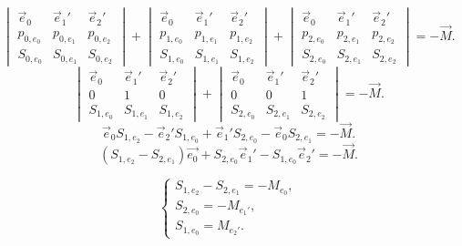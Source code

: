 \begin{equation*}
	\begin{vmatrix} 
		\vec e_0 &  \vec e_1' & \vec e_2' \\ 
		p_{0,{e_0}} & p_{0,{e_1}} & p_{0,{e_2}} \\ 
		S_{0,{e_0}} & S_{0,{e_1}} & S_{0,{e_2}}
	\end{vmatrix}
	+
	\begin{vmatrix} 
		\vec e_0 &  \vec e_1' & \vec e_2' \\ 
		p_{1,{e_0}} & p_{1,{e_1}} & p_{1,{e_2}} \\ 
		S_{1,{e_0}} & S_{1,{e_1}} & S_{1,{e_2}}
	\end{vmatrix}
	+
	\begin{vmatrix} 
		\vec e_0 &  \vec e_1' & \vec e_2' \\ 
		p_{2,{e_0}} & p_{2,{e_1}} & p_{2,{e_2}} \\ 
		S_{2,{e_0}} & S_{2,{e_1}} & S_{2,{e_2}}
	\end{vmatrix}
	= -\vec{M}.
\end{equation*}
\begin{equation*}
	\begin{vmatrix} 
		\vec e_0 &  \vec e_1' & \vec e_2' \\ 
		0 & 1 & 0 \\ 
		S_{1,{e_0}} & S_{1,{e_1}} & S_{1,{e_2}}
	\end{vmatrix}
	+
	\begin{vmatrix} 
		\vec e_0 &  \vec e_1' & \vec e_2' \\ 
		0 & 0 & 1 \\ 
		S_{2,{e_0}} & S_{2,{e_1}} & S_{2,{e_2}}
	\end{vmatrix}
	= -\vec{M}.
\end{equation*}
\begin{equation*}
	\vec e_0 S_{1,{e_2}} - \vec e_2' S_{1,{e_0}} + \vec e_1'S_{2,{e_0}} - \vec e_0 S_{2,{e_1}}
	= -\vec{M}.
\end{equation*}
\begin{equation*}
	\left(S_{1,{e_2}} -  S_{2,{e_1}} \right)\vec{e_0}
	+ S_{2,{e_0}} \vec e_1' 
	- S_{1,{e_0}} \vec e_2' 
	= -\vec{M}.
\end{equation*}

\begin{equation}
\left\{\begin{array}{l}
	S_{1,{e_2}} -  S_{2,{e_1}} = - M_{e_0},\\
	S_{2,{e_0}} = -M_{e_1'},\\
	S_{1,{e_0}} = M_{e_2'}.
\end{array}\right.
\end{equation}

